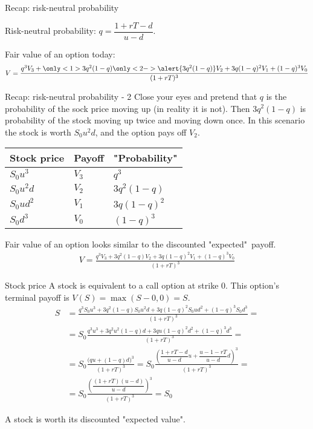 \documentclass{beamer}
\begin{document}
\begin{frame}{Recap: risk-neutral probability}

\justify
Risk-neutral probability: $q = \dfrac{1 + rT - d}{u - d}$.

\justify
Fair value of an option today:
\begin{align*}
V = \frac{q^3V_3 + \only<1>{3q^2(1-q)}\only<2->{\alert{3q^2(1-q)}}V_2 + 3q(1-q)^2V_1 + (1-q)^3V_0}{(1+rT)^3}
\end{align*}
\end{frame}


\begin{frame}{Recap: risk-neutral probability - 2}
\justify
Close your eyes and pretend that $q$ is the probability of the sock price moving up (in reality it is not). Then $3q^2(1-q)$ is probability of the stock moving up twice and moving down once. In this scenario the stock is worth  $S_0u^2d$, and the option pays off $V_2$.

\justify
\centering
\begin{tabular}{l|l|l}
Stock price & Payoff & "Probability" \\ \hline
$S_0u^3$   & $V_3$   & $q^3$ \\
$S_0u^2d$  & $V_2$   & $3q^2(1-q)$ \\
$S_0ud^2$  & $V_1$   & $3q(1-q)^2$ \\ 
$S_0d^3$   & $V_0$   & $(1-q)^3$ 
\end{tabular}

\justify
Fair value of an option looks similar to the discounted "expected"\ payoff.
\begin{align*}
V = \frac{q^3V_3 + 3q^2(1-q)V_2 + 3q(1-q)^2V_1 + (1-q)^3V_0}{(1+rT)^3}
\end{align*}
\end{frame}



\begin{frame}{Stock price}
\justify
A stock is equivalent to a call option at strike 0. This option's terminal payoff is  $V(S) = \max(S-0, 0) = S$.
\begin{align*}
S &= \frac{q^3S_0u^3 + 3q^2(1-q)S_0u^2d + 3q(1-q)^2S_0ud^2 + (1-q)^3S_0d^3}{(1+rT)^3} = \\
&= S_0\frac{q^3u^3 + 3q^2u^2(1-q)d + 3qu(1-q)^2d^2 + (1-q)^3d^3}{(1+rT)^3} = \\
&= S_0\frac{\Big(qu + (1-q)d \Big)^3}{(1+rT)^3} 
= S_0\frac{\left(\dfrac{1+rT-d}{u-d}u + \dfrac{u-1-rT}{u-d}d \right)^3}{(1+rT)^3} = \\
&= S_0 \frac{\left(\dfrac{(1+rT)(u-d)}{u-d} \right)^3}{(1+rT)^3} = S_0
\end{align*}

\justify
A stock is worth its discounted "expected value".
\end{frame}
\end{document}
